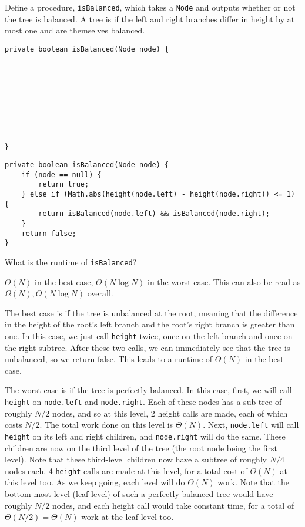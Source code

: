\begin{blocksection}
\question Define a procedure, \lstinline$isBalanced$, which takes a
\lstinline$Node$ and outputs whether or not the tree is balanced. A tree is
 if the left and right branches differ in height by at most
one and are themselves balanced.

\ifprintanswers
\else
\begin{lstlisting}
private boolean isBalanced(Node node) {









}
\end{lstlisting}
\fi

\begin{solution}
\begin{lstlisting}
private boolean isBalanced(Node node) {
    if (node == null) {
        return true;
    } else if (Math.abs(height(node.left) - height(node.right)) <= 1) {
        return isBalanced(node.left) && isBalanced(node.right);
    }
    return false;
}
\end{lstlisting}
\end{solution}

What is the runtime of \lstinline$isBalanced$?
\begin{solution}[0.25in]
$\Theta(N)$ in the best case, $\Theta(N \log N)$ in the worst case.  This can
also be read as $\Omega(N), O(N \log N)$ overall.

The best case is if the tree is unbalanced at the root, meaning that the
difference in the height of the root's left branch and the root's right branch
is greater than one. In this case, we just call \lstinline$height$ twice, once
on the left branch and once on the right subtree. After these two calls, we can
immediately see that the tree is unbalanced, so we return false. This leads to
a runtime of $\Theta(N)$ in the best case.

The worst case is if the tree is perfectly balanced. In this case, first, we will call \lstinline$height$ 
on \lstinline$node.left$ and \lstinline$node.right$. Each of these nodes has a sub-tree of roughly $N/2$ nodes, 
and so at this level, 2 height calls are made, each of which costs $N/2$. The total work done on this level is
$\Theta(N)$. Next, \lstinline$node.left$ will call \lstinline$height$ on its left and right children, and \lstinline$node.right$ will do the same. These children are now on the third level of the tree (the root node being the first level). Note that these third-level children now have a subtree of roughly $N/4$ nodes each. 4 \lstinline$height$ calls are made at this level, for a total cost of $\Theta(N)$ at this level too. As we keep going, each level will do $\Theta(N)$ work. Note that the bottom-most level (leaf-level) of such a perfectly balanced tree would have roughly $N/2$ nodes, and each height call would take constant time, for a total of $\Theta(N/2) = \Theta(N)$ work at the leaf-level too. 


\end{solution}
\end{blocksection}
